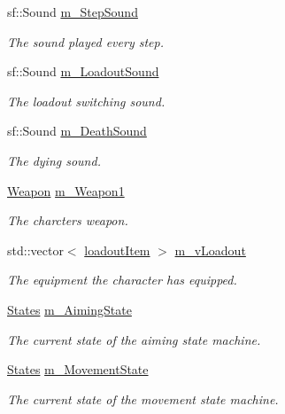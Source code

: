 \begin{DoxyCompactItemize}
sf\+::\+Sound \hyperlink{class_character_ae6e5a7edea1bbd417ca443ce981de5b5}{m\+\_\+\+Step\+Sound}
\begin{DoxyCompactList}\small\item\em The sound played every step. \end{DoxyCompactList}\item 
sf\+::\+Sound \hyperlink{class_character_a142f2e93b0aeee4501970a1bbe6050ed}{m\+\_\+\+Loadout\+Sound}
\begin{DoxyCompactList}\small\item\em The loadout switching sound. \end{DoxyCompactList}\item 
sf\+::\+Sound \hyperlink{class_character_ab3edae28957985578ed4c4ec5534c04c}{m\+\_\+\+Death\+Sound}
\begin{DoxyCompactList}\small\item\em The dying sound. \end{DoxyCompactList}\item 
\hyperlink{class_weapon}{Weapon} \hyperlink{class_character_aa5e5b12f44f1331e934b40435f258805}{m\+\_\+\+Weapon1}
\begin{DoxyCompactList}\small\item\em The charcter\textquotesingle{}s weapon. \end{DoxyCompactList}\item 
std\+::vector$<$ \hyperlink{_character_8h_a00971beaa8e80879643e933973580d61}{loadout\+Item} $>$ \hyperlink{class_character_a7e27911963e4a99b0dbaccae0c182537}{m\+\_\+v\+Loadout}
\begin{DoxyCompactList}\small\item\em The equipment the character has equipped. \end{DoxyCompactList}\item 
\hyperlink{_character_8h_a808e5cd4979462d3bbe3070d7d147444}{States} \hyperlink{class_character_a8f710841b6c872e84a9d6940c0123e4b}{m\+\_\+\+Aiming\+State}
\begin{DoxyCompactList}\small\item\em The current state of the aiming state machine. \end{DoxyCompactList}\item 
\hyperlink{_character_8h_a808e5cd4979462d3bbe3070d7d147444}{States} \hyperlink{class_character_a5c308b63279b8206e2c8014f15e660bc}{m\+\_\+\+Movement\+State}
\begin{DoxyCompactList}\small\item\em The current state of the movement state machine. \end{DoxyCompactList}\item 

\end{DoxyCompactItemize}
